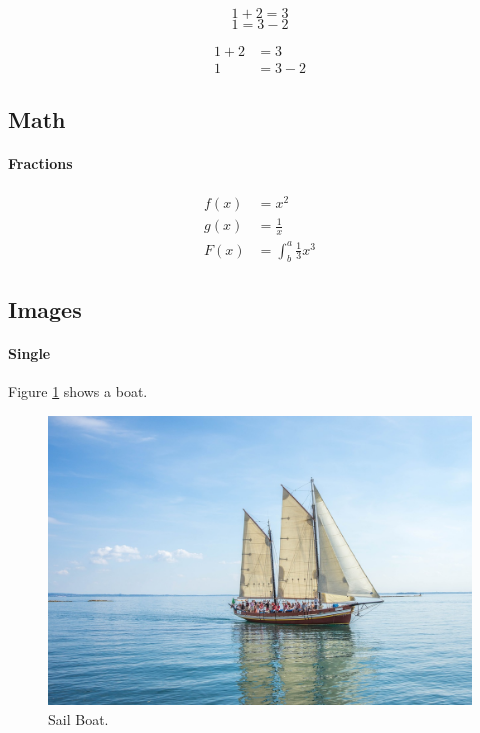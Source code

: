 \documentclass{article}
\begin{document}
\begin{equation*}
  1 + 2 = 3 
\end{equation*}
\begin{equation*}
  1 = 3 - 2
\end{equation*}

\begin{align*}
  1 + 2 &= 3\\
  1 &= 3 - 2
\end{align*}

\subsection{Math}

\paragraph{Fractions}
\begin{align*}
  f(x) &= x^2\\
  g(x) &= \frac{1}{x}\\
  F(x) &= \int^a_b \frac{1}{3}x^3
\end{align*}

\newpage

\subsection{Images}

\paragraph{Single}

Figure \ref{fig:sailboat} shows a boat. %

\begin{figure}[h!]
  \includegraphics[width=\linewidth]{boat.jpg}
  \caption{Sail Boat.}
  \label{fig:sailboat} %
\end{figure}
\end{document}
